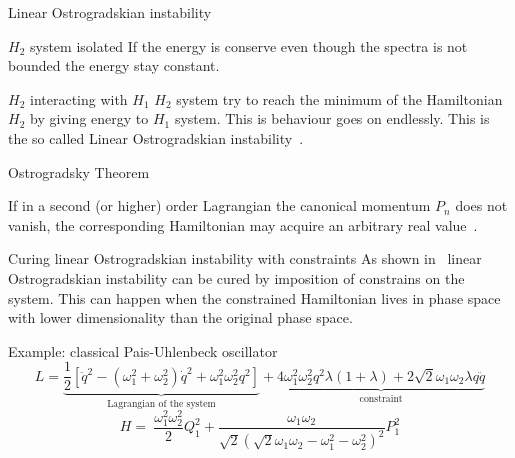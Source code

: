 \begin{frame}{Linear Ostrogradskian instability}
  \begin{alertblock}{$H_2$ system isolated}
    \vspace{0.5em}
    If the energy is conserve even though the spectra is not bounded the
    energy stay constant.
  \end{alertblock}
  \vspace{2.0em}
  \begin{alertblock}{$H_2$ interacting with $H_1$}
    \vspace{0.5em}
    $H_2$ system try to reach the minimum of the Hamiltonian $H_2$ by giving
    energy to $H_1$ system. This is behaviour goes on endlessly. This is the
    so called \alert{Linear Ostrogradskian instability}~\cite{Kallosh08,
    Eliezer89}.
  \end{alertblock}
\end{frame}

\begin{frame}{Ostrogradsky Theorem}
  \begin{theorem}[Ostrogradsky] \vspace{0.5em}
    If in a second (or higher) order Lagrangian the canonical momentum $P_n$
    does not vanish, the corresponding Hamiltonian may acquire an arbitrary
    real value~\cite{Smilga17}.
  \end{theorem}
\end{frame}

\begin{frame}{Curing linear Ostrogradskian instability with constraints}
  As shown in~\cite{Chen13} linear Ostrogradskian instability can be cured by
  imposition of constrains on the system. This can happen when the constrained
  Hamiltonian lives in phase space with lower dimensionality than the original
  phase space. \vspace{1.0em}
  \begin{block}{Example: classical Pais-Uhlenbeck oscillator}
    \vspace{0.2em}
    \begin{equation*}
      L =
      \underbrace{
        \frac{1}{2} \left[
        \ddot{q}^2 - (\omega_1^2 + \omega_2^2) \dot{q}^2 +
        \omega_1^2 \omega_2^2 q^2 \right]
      }_{\text{Lagrangian of the system}} +
      \underbrace{
        4 \omega_1^2\omega_2^2 q^2 \lambda (1+ \lambda) +
        2 \sqrt{2} \omega_1\omega_2 \lambda q \ddot{q}
      }_{\text{constraint}}
    \end{equation*}
    \vspace{0.2em}
    \begin{equation*}
      H =\ \frac{\omega_1^2\omega_2^2}{2} Q_1^2 +
      \frac{\omega_1\omega_2}{\sqrt{2} {\left(\sqrt{2} \omega_1\omega_2 -
      \omega_1^2 - \omega_2^2 \right)}^2} P_1^2
    \end{equation*}
  \end{block}
\end{frame}


